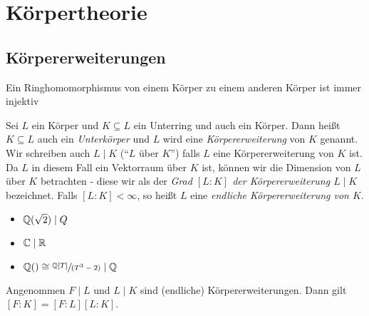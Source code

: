 \graphicspath{{Images/}}

\chapter{Körpertheorie}

\section{Körpererweiterungen}
\begin{remark}
	Ein Ringhomomorphismus von einem Körper zu einem anderen Körper ist immer injektiv 
\end{remark}

\begin{definition}
	Sei $L$ ein Körper und $K \subseteq L$ ein Unterring und auch ein Körper.
	Dann heißt $K \subseteq L$ auch ein \emph{Unterkörper} und $L$ wird eine \emph{Körpererweiterung} von  $K$ genannt.
	Wir schreiben auch $L \mid K$ (\enquote{$L$ über $K$}) falls $L$ eine Körpererweiterung von $K$ ist.
	Da $L$ in diesem Fall ein Vektorraum über $K$ ist, können wir die Dimension von $L$ über $K$ betrachten -
	diese wir als der \emph{Grad $[L:K]$ der Körpererweiterung  $L \mid K$} bezeichnet.
	Falls $[L:K] < \infty$, so heißt $L$ eine \emph{endliche Körpererweiterung von $K$}.
\end{definition}

\begin{eg}
	\begin{itemize}
		\item $\mathbb{Q}(\sqrt{2}) \mid Q$
		\item $\mathbb{C} \mid \mathbb{R}$ 
		\item $\mathbb{Q}() \cong \sfrac[3]{\mathbb{Q}[T]}{(T^3-2)} \mid \mathbb{Q} $
	\end{itemize}
\end{eg}

\begin{theorem}
	Angenommen $F \mid L $ und $L \mid K$ sind (endliche) Körpererweiterungen.
	Dann gilt $[F:K] = [F:L] [L:K]$.
\end{theorem}

